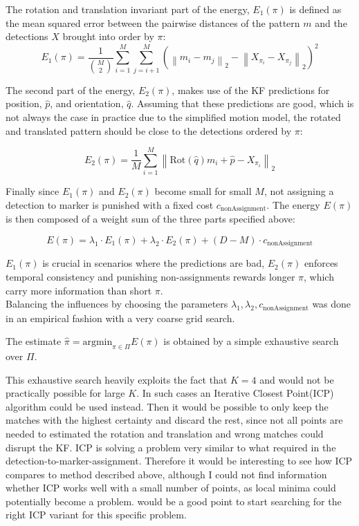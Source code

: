 \documentclass[12pt,a4paper]{article}
\begin{document}
The rotation and translation invariant part of the energy, $E_1(\pi)$ is defined as the mean squared error between the pairwise distances of the pattern  $m$ and the detections  $X$ brought into order by $\pi$:
\begin{equation}
	E_1(\pi) =  \frac{1}{\binom{M}{2}}\sum_{i =1}^M\sum_{j =i+1}^M \left( \left\| m_i - m_j\right\|_2 - \left\| X_{\pi_i} - X_{\pi_j}\right\|_2 \right)^2
\end{equation}

The second part of the energy, $E_2(\pi)$, makes use of the KF predictions  for position, $\hat{p}$,  and orientation, $\hat{q}$. Assuming that these predictions are good, which is not always the case in practice due to the simplified motion model, the rotated and translated pattern should be close to the detections ordered by $\pi$:

\begin{equation}
	E_2(\pi) = \frac{1}{M}\sum_{i =1}^M \left\| \text{Rot}(\hat{q})m_i + \hat{p}- X_{\pi_i}\right\|_2 
\end{equation}

Finally since $E_1(\pi)$ and $E_2(\pi) $ become small for small $M$, not assigning a detection to marker is punished with a fixed cost $c_{\text{nonAssignment}}$. The energy $E(\pi)$ is then composed of a weight sum of the three parts specified above:

\begin{equation}
	E(\pi) = \lambda_1 \cdot E_1(\pi) + \lambda_2 \cdot E_2(\pi) + (D-M) \cdot c_{\text{nonAssignment}}
\end{equation}

$E_1(\pi)$ is crucial in scenarios where the predictions are bad, $E_2(\pi)$ enforces temporal consistency and punishing non-assignments rewards longer $\pi$, which carry more information than short $\pi$.\\
Balancing the influences by choosing the parameters $\lambda_1, \lambda_2, c_{\text{nonAssignment}}$ was done in an empirical fashion with a very coarse grid search. %

The estimate 
$
	\hat{\pi} = \text{argmin}_{\pi \in \Pi} E(\pi)
$
is obtained by a simple exhaustive search over $\Pi$.



This exhaustive search heavily exploits the fact that $K=4$ and would not be practically possible for large $K$. In such cases an Iterative Closest Point(ICP) \cite{icp} algorithm could be used instead. Then it would be possible to only keep the matches with the highest certainty and discard the rest, since not all points are needed to estimated the rotation and translation and wrong matches could disrupt the KF. ICP is solving a problem very similar to what required in the detection-to-marker-assignment. Therefore it would be interesting to see how ICP compares to method described above, although I could not find information whether ICP works well with a small number of points, as local minima could potentially become a problem. \cite{icp_review} would be a good point to start searching for the right ICP variant for this specific problem.
\end{document}

